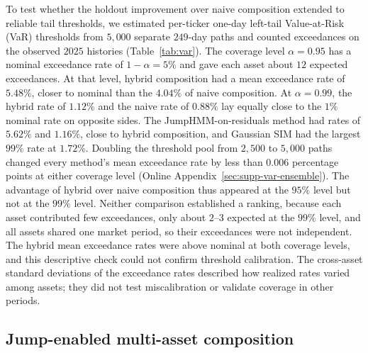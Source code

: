 To test whether the holdout improvement over naive composition
extended to reliable tail thresholds, we estimated per-ticker one-day
left-tail Value-at-Risk (VaR) thresholds from $5{,}000$ separate
$249$-day paths and counted exceedances on the observed $2025$
histories (Table~\ref{tab:var}). The coverage level
$\alpha=0.95$ has a nominal exceedance rate of $1-\alpha=5\%$ and gave
each asset about $12$ expected exceedances. At that level, hybrid
composition had a mean
exceedance rate of $5.48\%$, closer to nominal than the $4.04\%$ of
naive composition. At $\alpha=0.99$, the hybrid rate of $1.12\%$ and
the naive rate of $0.88\%$ lay equally close to the $1\%$ nominal rate
on opposite sides. The JumpHMM-on-residuals method had rates of
$5.62\%$ and $1.16\%$, close to hybrid composition, and Gaussian SIM
had the largest $99\%$ rate at $1.72\%$. Doubling the threshold pool from
$2{,}500$ to $5{,}000$ paths changed every method's mean exceedance
rate by less than $0.006$ percentage points at either coverage level
(Online Appendix~\ref{sec:supp-var-ensemble}). The advantage of hybrid over
naive composition thus appeared at the $95\%$ level but not at the
$99\%$ level. Neither comparison established a ranking, because each
asset contributed few exceedances, only about $2$--$3$ expected at the
$99\%$ level, and all assets shared one market period, so their
exceedances were not independent. The hybrid mean exceedance rates were above nominal at both
coverage levels, and this descriptive check could not confirm
threshold calibration. The
cross-asset standard deviations of the exceedance rates described how
realized rates varied among assets; they did not test miscalibration
or validate coverage in other periods.




\subsection{Jump-enabled multi-asset composition}
\label{sec:results-jump-composition}

